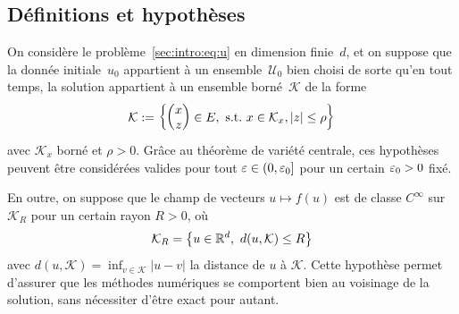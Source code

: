 \subsection*{Définitions et hypothèses}


On considère le problème~\eqref{sec:intro:eq:u} en dimension finie~$d$, et on suppose que la donnée initiale~$u_0$ appartient à un ensemble~$\mathcal{U}_0$ bien choisi de sorte qu'en tout temps, la solution appartient à un ensemble borné~$\mathcal{K}$ de la forme
\begin{equation*}
    \mathcal{K} := \left\{ \begin{pmatrix} x \\ z \end{pmatrix} \in E,\ \mathrm{s.t.}\ x \in \mathcal{K}_x, |z| \leq \rho  \right\} 
\end{equation*}
avec $\mathcal{K}_x$ borné et $\rho > 0$. Grâce au théorème de variété centrale, ces hypothèses peuvent être considérées valides pour tout $\varepsilon \in (0, \varepsilon_0]$ pour un certain $\varepsilon_0 > 0$ fixé. 

En outre, on suppose que le champ de vecteurs $u \mapsto f(u)$ est de classe $C^\infty$ sur $\mathcal{K}_R$ pour un certain rayon $R > 0$, où
\begin{equation*}
    \mathcal{K}_R = \left\lbrace u \in \mathbb{R}^d,\ d(u, \mathcal{K}) \leq R \right\rbrace 
\end{equation*} 
avec $d(u, \mathcal{K}) = \inf_{v \in \mathcal{K}} |u-v|$ la distance de $u$ à $\mathcal{K}$. Cette hypothèse permet d'assurer que les méthodes numériques se comportent bien au voisinage de la solution, sans nécessiter d'être exact pour autant. 